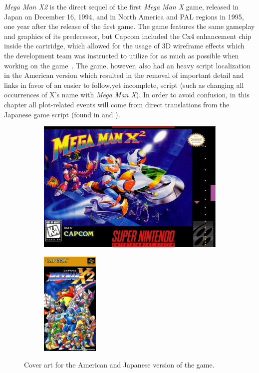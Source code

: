 
\textit{Mega Man X2} is the direct sequel of the first \textit{Mega Man X} game, released in Japan on December 16, 1994, and in North America and PAL regions in 1995, one year after the release of the first game. The game features the same gameplay and graphics of its predecessor, but  Capcom included the Cx4 enhancement chip inside the cartridge, which allowed for the usage of 3D wireframe effects which the development team was instructed to utilize for as much as possible when working on the game~\cite{wiki:MMX2}. The game, however, also had an heavy script localization in the American version which resulted in the removal of important detail and links in favor of an easier to follow,yet incomplete, script (such as changing all occurrences of X's name with \textit{Mega Man X}). In order to avoid confusion, in this chapter all plot-related events will come from direct translations from the Japanese game script (found in \cite{wordpress:X2_japanese_script} and \cite{gamesfaq:X2_japanese_script}).

\begin{figure}[htp]
	\centering
	\begin{subfigure}{0.4\linewidth}
		\centering
		\includegraphics[width=\linewidth]{figures/X2/Mega_Man_X2_Box_Art.png}
	\end{subfigure}
	\begin{subfigure}{0.4\linewidth}
		\centering
		\includegraphics[height=5cm]{figures/X2/Rockman_X2_Box_Art.png}
	\end{subfigure}
	\caption{Cover art for the American and Japanese version of the game.}
\end{figure}


